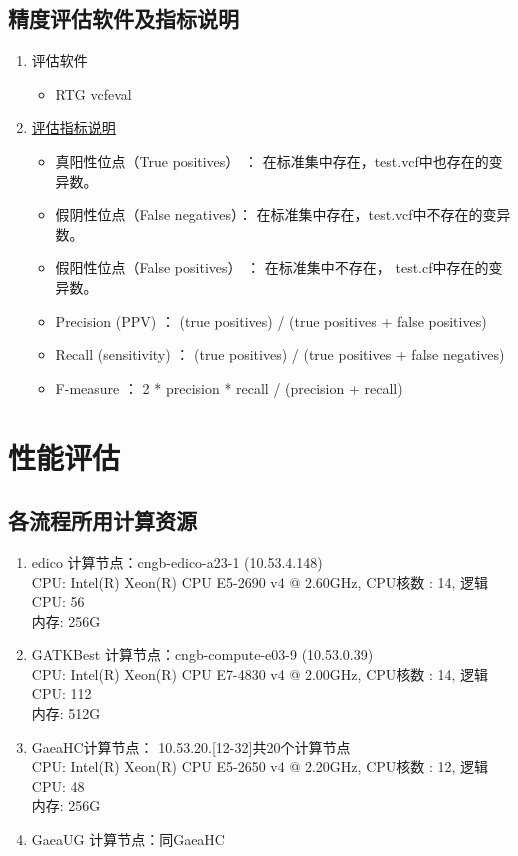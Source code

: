 \documentclass[UTF8,10pt,a4paper]{ctexart}
\begin{document}
\subsection{精度评估软件及指标说明}
\begin{enumerate}
\item 评估软件
\begin{itemize}
\item RTG vcfeval
\end{itemize}
\item \href{https://note.youdao.com/share/?token=170F71A3F2494D089B29E2AD944A6ECA&gid=12269890}{评估指标说明}
\begin{itemize}
\item 真阳性位点（True positives）  ：  在标准集中存在，test.vcf中也存在的变异数。 
\item 假阴性位点（False negatives）：  在标准集中存在，test.vcf中不存在的变异数。
\item 假阳性位点（False positives） ：  在标准集中不存在， test.cf中存在的变异数。
\item Precision (PPV) 		： (true positives) / (true positives + false positives) 
\item Recall (sensitivity)		： (true positives) / (true positives + false negatives) 
\item F-measure			： 2 * precision * recall / (precision + recall)
\end{itemize}
\end{enumerate}


\section{性能评估}
\subsection{各流程所用计算资源}
\begin{enumerate}
\item edico 计算节点：cngb-edico-a23-1 (10.53.4.148)\\
         CPU: Intel(R) Xeon(R) CPU E5-2690 v4 @ 2.60GHz, CPU核数 : 14,  逻辑CPU: 56\\
	 内存: 256G
\item GATKBest 计算节点：cngb-compute-e03-9 (10.53.0.39)\\
	 CPU: Intel(R) Xeon(R) CPU E7-4830 v4 @ 2.00GHz, CPU核数 : 14,  逻辑CPU: 112\\
	 内存: 512G
\item GaeaHC计算节点： 10.53.20.[12-32]共20个计算节点\\
	 CPU: Intel(R) Xeon(R) CPU E5-2650 v4 @ 2.20GHz, CPU核数 : 12,  逻辑CPU: 48\\
	 内存: 256G
\item GaeaUG 计算节点：同GaeaHC
\end{enumerate}
\end{document}
